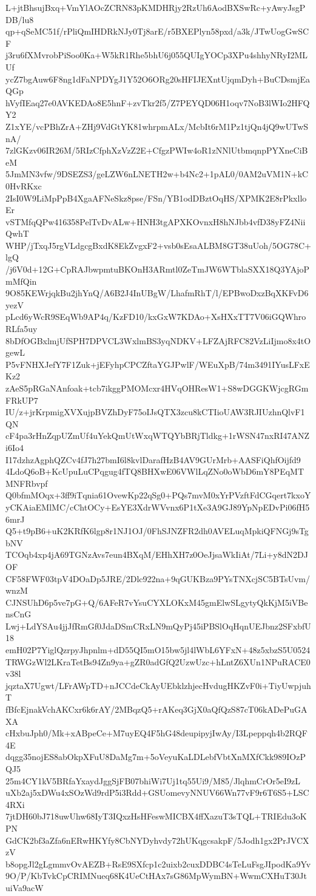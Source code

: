 L+jtBhsujBxq+VmYlAOcZCRN83pKMDHRjy2RzUh6AodBXSwRc+yAwyJsgPDB/lu8
qp+qSeMC51f/rPliQmIHDRkNJy0Tj8arE/r5BXEPlyn58pxd/a3k/JTwUogGwSCF
j3ru6fXMvrobPiSoo0Ka+W5kR1Rhe5bhU6j055QUIgYOCp3XPu4shhyNRyI2MLUf
ycZ7bgAuw6F8ng1dFaNPDYgJ1Y52O6ORg20sHFIJEXntUjqmDyh+BuCDsmjEaQGp
hVyfIEaq27e0AVKEDAo8E5hnF+zvTkr2f5/Z7PEYQD06H1oqv7NoB3lWIo2HFQY2
Z1xYE/vcPBhZrA+ZHj9VdGtYK81whrpmALx/McbIt6rM1Pz1tjQn4jQ9wUTwSnA/
7zlGKzv06IR26M/5RIzCfphXzVzZ2E+CfgzPWIw4oR1zNNlUtbmqnpPYXneCiBeM
5JmMN3vfw/9DSEZS3/geLZW6nLNETH2w+b4Nc2+1pAL0/0AM2uVM1N+kC0HvRKxc
2IsI0W9LiMpPpB4XgaAFNeSkz8pse/FSn/YB1odDBztOqHS/XPMK2E8rPkxlloEr
vSTMfqQPw416358PelTvDvALw+HNH3tgAPXKOvnxH8hNJbb4vfD38yFZ4NiiQwhT
WHP/jTxqJ5rgVLdgcgBxdK8EkZvgxF2+vsb0sEsaALBM8GT38uUoh/5OG78C+lgQ
/j6V0d+12G+CpRAJbwpmtuBKOnH3ARmtl0ZeTmJW6WTblaSXX18Q3YAjoPmMfQin
9O85KEWrjqkBu2jhYnQ/A6B2J4InUBgW/LhafmRhT/l/EPBwoDxzBqXKFvD6yezV
pLcd6yWcR9SEqWb9AP4q/KzFD10/kxGxW7KDAo+XsHXxTT7V06iGQWhroRLfa5uy
8bDfOGBxlmjUfSPH7DPVCL3WxlmBS3yqNDKV+LFZAjRFC82VzLiIjmo8x4tOgewL
P5vFNHXJefY7F1Zuk+jEFyhpCPCZftaYGJPwlF/WEuXpB/74m3491IYusLFxEKz2
zAeS5pRGaNAnfoak+tcb7ikggPMOMcxr4HVqOHResW1+S8wDGGKWjcgRGmFRkUP7
IU/z+jrKrpmigXVXujpBVZhDyF75oIJsQTX3zcu8kCTIioUAW3RJIUzhnQlvF1QN
cF4pa3rHnZqpUZmUf4uYekQmUtWxqWTQYbBRjTldkg+1rWSN47nxRI47ANZi6Io4
I17dzhzAgphQZCv4fJ7h27bmI6l8kvlDarafHzB4AV9GUrMrb+AASFiQhfOijfd9
4LdoQ6oB+KcUpuLuCPqgug4fTQ8BHXwE06VWlLqZNo0oWbD6mY8PEqMTMNFRbvpf
Q0bfmMOqx+3ff9iTqnia61OvewKp22qSg0+PQs7mvM0xYrPVzftFdCGqert7kxoY
yCKAiaEMlMC/cChtOCy+EsYE3XdrWVvnx6P1tXe3A9GJ89YpNpEDvPi06fH56mrJ
Q5+t9pB6+uK2KRfK6lgp8r1NJ1OJ/0FhSJNZFR2dh0AVELuqMpkiQFNGj9sTgbNV
TCOqb4xp4jA69TGNzAvs7eun4BXqM/EHhXH7z0OeJjsaWkIiAt/7Li+y8dN2DJOF
CF58FWF03tpV4DOaDp5JRE/2Dlc922na+9qGUKBza9PYsTNXcjSC5BTsUvm/wnzM
CJNSUhD6p5ve7pG+Q/6AFeR7vYsuCYXLOKxM45gmElwSLgytyQkKjM5iVBensCnG
Lwj+LdYSAu4jjJfRmGf0JdaDSmCRxLN9mQyPj45iPBSlOqHqnUEJbnz2SFxbfU18
emH02P7YiglQzrpyJhpnlm+dD55QI5mO15bw5jl4lWbL6YFxN+48z5xbzS5U0524
TRWGzWl2LKraTetBs94Zn9ya+gZR0adGfQ2UzwUzc+hLntZ6XUn1NPuRACE0v38l
jqztaX7Ugwt/LFrAWpTD+nJCCdeCkAyUEbklzhjecHvdugHKZvF0i+TiyUwpjuhT
fBfcEjnakVchAKCxr6k6rAY/2MBqzQ5+rAKeq3GjX0aQfQzS87cT06kADePuGAXA
cHxbuJph0/Mk+xABpeCe+M7uyEQ4F5hG48deupipyjIwAy/I3Lpeppqh4b2RQF4E
dqgg35nojES8abOkpXFuU8DaMg7m+5oVeyuKaLDLebfVbtXnMXfCkk989IOzPQJ5
25m4CY1kV5BRfaYxaydJggSjFB07bhiWi7Uj1tq55Ui9/M85/JlqhmCrOr5eI9zL
uXb2aj5xDWu4xSOzWd9rdP5i3Rdd+GSUomevyNNUV66Wn77vF9r6T6S5+LSC4RXi
7jtDH60bJ718uwUhw68IyT3IQxzHsHFeswMICBX4ffXazuT3sTQL+TRIEdu3oKPN
GdCK2bf3aZfa6nERwHKYfy8CbNYDyhvdy72hUKqgcsakpF/5Jodh1gx2PrJVCXzV
b8opgJl2gLgmmvOvAEZB+RsE9SXfcp1c2uixb2cuxDDBC4sTeLuFsgJIpodKa9Yv
9O/P/KbTvkCpCRIMNueq68K4UeCtHAx7sG86MpWymBN+WwmCXHuT30JtuiVa9acW
